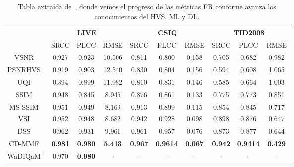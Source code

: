 \begin{table}[htp]
  \tiny
  \centering
  \begin{tabular}{|c|c|c|c|c|c|c|c|c|c|}
    \hline
    \rowcolor[HTML]{FFC702}
    \cellcolor[HTML]{FFC702}&  \multicolumn{3}{c|}{\cellcolor[HTML]{FFC702}\textbf{LIVE}}& \multicolumn{3}{c|}{\cellcolor[HTML]{FFC702}\textbf{CSIQ}} & \multicolumn{3}{c|}{\cellcolor[HTML]{FFC702}\textbf{TID2008}} \\ \cline{2-10}
    \rowcolor[HTML]{FFC702}
    \multirow{-2}{*}{\textbf{Métrica}} & SRCC & PLCC & RMSE & SRCC & PLCC & RMSE & SRCC & PLCC & RMSE \\
    \hline
                   VSNR~\cite{VSNR} & 0.927 & 0.923 & 10.506 & 0.811 & 0.800 & 0.158 & 0.705 & 0.682 & 0.982 \\
                   PSNRHVS~\cite{PSNR-HVS} & 0.919 & 0.903 & 12.540 & 0.830 & 0.804 & 0.156 & 0.594 & 0.608 & 1.065 \\
                   UQI~\cite{UQI} & 0.894 & 0.899 & 11.982 & 0.810 & 0.831 & 0.146 & 0.585 & 0.664 & 1.003 \\
                   SSIM~\cite{SSIM} & 0.948 & 0.845 & 8.946 & 0.876 & 0.861 & 0.133 & 0.775 & 0.773 & 0.851 \\ 
                   MS-SSIM~\cite{MS-SSIM} & 0.951 & 0.949 & 8.169 & 0.913 & 0.899 & 0.115 & 0.854 & 0.845 & 0.717 \\
                   VSI~\cite{VSI} & 0.952 & 0.948 & 8.682 & 0.942 & 0.928 & 0.098 & 0.898 & 0.876 & 0.647 \\
                   DSS~\cite{DSS} & 0.962 & 0.931 & 9.961 & 0.961 & 0.957 & 0.076 & 0.873 & 0.877 & 0.644 \\
                   CD-MMF~\cite{MMF} & \textbf{0.981} & \textbf{0.980} & \textbf{5.413} & \textbf{0.967} & \textbf{0.9614} & \textbf{0.067} & \textbf{0.942} & \textbf{0.9414} & \textbf{0.429} \\
                   WaDIQaM~\cite{DIQaM} & 0.970 & \textbf{0.980} & - & - & - & - & - & - & - \\
                  \hline 
  \end{tabular}
  \caption[Tablas estado del arte FR-IQA.]{Tabla extraída de~\cite{SurveyOf2D3DMetrics}, 
    donde vemos el progreso de las métricas FR conforme avanza los conocimientos
  del HVS, ML y DL.}
    \label{tab:SOTAFRIQA}
\end{table}

